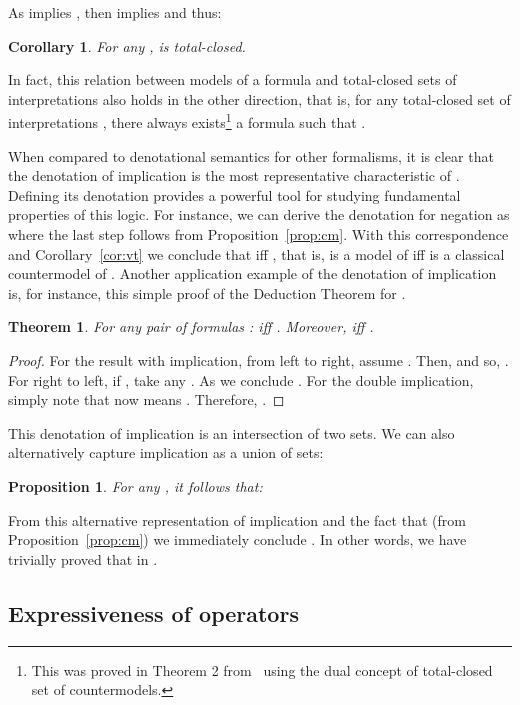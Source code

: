 \documentclass{tlp}
\def\qed{~\hfill}
\newtheorem{theorem}{Theorem}
\newtheorem{corollary}{Corollary}
\newtheorem{proposition}{Proposition}
\begin{document}
\noindent As  implies , then  implies  and thus: 
\begin{corollary}\label{cor:vt1}
For any ,  is total-closed.\qed
\end{corollary}

\noindent In fact, this relation between models of a formula and total-closed sets of interpretations also holds in the other direction, that is, for any total-closed set of interpretations , there always exists\footnote{This was proved in Theorem 2 from~\cite{CF07} using the dual concept of total-closed set of countermodels.} a formula  such that .

When compared to denotational semantics for other formalisms, it is clear that the denotation of implication is the most representative characteristic of . Defining its denotation provides a powerful tool for studying fundamental properties of this logic. For instance, we can derive the denotation for negation as  where the last step follows from Proposition~\ref{prop:cm}. With this correspondence and Corollary~\ref{cor:vt} we conclude that  iff , that is,  is a model of  iff  is a classical countermodel of . Another application example of the denotation of implication is, for instance, this simple proof of the Deduction Theorem for .

\begin{theorem}
For any pair of formulas :  iff . Moreover,  iff .
\end{theorem}

\begin{proof}
For the result with implication, from left to right, assume . Then,  and so, . For right to left, if , take any . As  we conclude . For the double implication, simply note that  now means . Therefore, .
\end{proof}

\noindent This denotation of implication is an intersection of two sets. We can also alternatively capture implication as a union of sets:
\begin{proposition}\label{prop:vt2} 
For any , it follows that:

\end{proposition}

From this alternative representation of implication and the fact that  (from Proposition~\ref{prop:cm}) we immediately conclude . In other words, we have trivially proved that  in .

\subsection{Expressiveness of operators}
\end{document}
